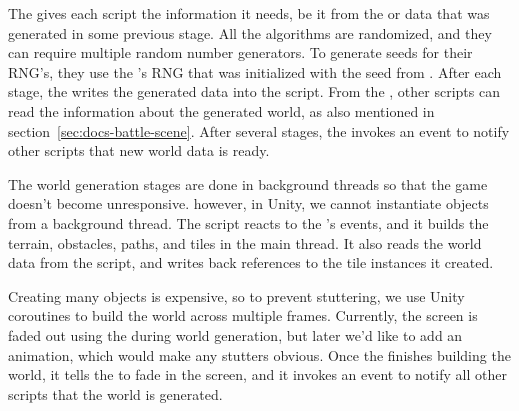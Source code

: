 The  gives each script the information it needs, be it from the  or data that was generated in some previous stage.
All the algorithms are randomized, and they can require multiple random number generators.
To generate seeds for their RNG's, they use the 's RNG that was initialized with the seed from .
After each stage, the  writes the generated data into the  script.
From the , other scripts can read the information about the generated world, as also mentioned in section~\ref{sec:docs-battle-scene}.
After several stages, the  invokes an event to notify other scripts that new world data is ready.

The world generation stages are done in background threads so that the game doesn't become unresponsive.
however, in Unity, we cannot instantiate objects from a background thread.
The script  reacts to the 's events, and it builds the terrain, obstacles, paths, and tiles in the main thread.
It also reads the world data from the  script, and writes back references to the tile instances it created.

Creating many objects is expensive, so to prevent stuttering, we use Unity coroutines to build the world across multiple frames.
Currently, the screen is faded out using the  during world generation, but later we'd like to add an animation, which would make any stutters obvious.
Once the  finishes building the world, it tells the  to fade in the screen, and it invokes an event to notify all other scripts that the world is generated.